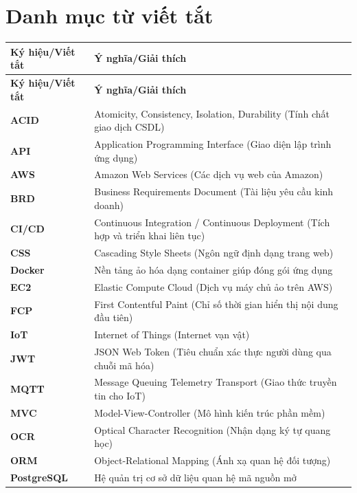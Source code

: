 \chapter*{Danh mục từ viết tắt}

\begin{flushleft}
\renewcommand{\arraystretch}{1.5}
\begin{xltabular}{\textwidth}{@{}l X@{}}
\toprule
\textbf{Ký hiệu/Viết tắt} & \textbf{Ý nghĩa/Giải thích} \\
\midrule
\endfirsthead
\toprule
\textbf{Ký hiệu/Viết tắt} & \textbf{Ý nghĩa/Giải thích} \\
\midrule
\endhead
\bottomrule
\endfoot
\textbf{ACID} & Atomicity, Consistency, Isolation, Durability (Tính chất giao dịch CSDL) \\
\textbf{API} & Application Programming Interface (Giao diện lập trình ứng dụng) \\
\textbf{AWS} & Amazon Web Services (Các dịch vụ web của Amazon) \\
\textbf{BRD} & Business Requirements Document (Tài liệu yêu cầu kinh doanh) \\
\textbf{CI/CD} & Continuous Integration / Continuous Deployment (Tích hợp và triển khai liên tục) \\
\textbf{CSS} & Cascading Style Sheets (Ngôn ngữ định dạng trang web) \\
\textbf{Docker} & Nền tảng ảo hóa dạng container giúp đóng gói ứng dụng \\
\textbf{EC2} & Elastic Compute Cloud (Dịch vụ máy chủ ảo trên AWS) \\
\textbf{FCP} & First Contentful Paint (Chỉ số thời gian hiển thị nội dung đầu tiên) \\
\textbf{IoT} & Internet of Things (Internet vạn vật) \\
\textbf{JWT} & JSON Web Token (Tiêu chuẩn xác thực người dùng qua chuỗi mã hóa) \\
\textbf{MQTT} & Message Queuing Telemetry Transport (Giao thức truyền tin cho IoT) \\
\textbf{MVC} & Model-View-Controller (Mô hình kiến trúc phần mềm) \\
\textbf{OCR} & Optical Character Recognition (Nhận dạng ký tự quang học) \\
\textbf{ORM} & Object-Relational Mapping (Ánh xạ quan hệ đối tượng) \\
\textbf{PostgreSQL} & Hệ quản trị cơ sở dữ liệu quan hệ mã nguồn mở \\

\end{xltabular}
\end{flushleft}
